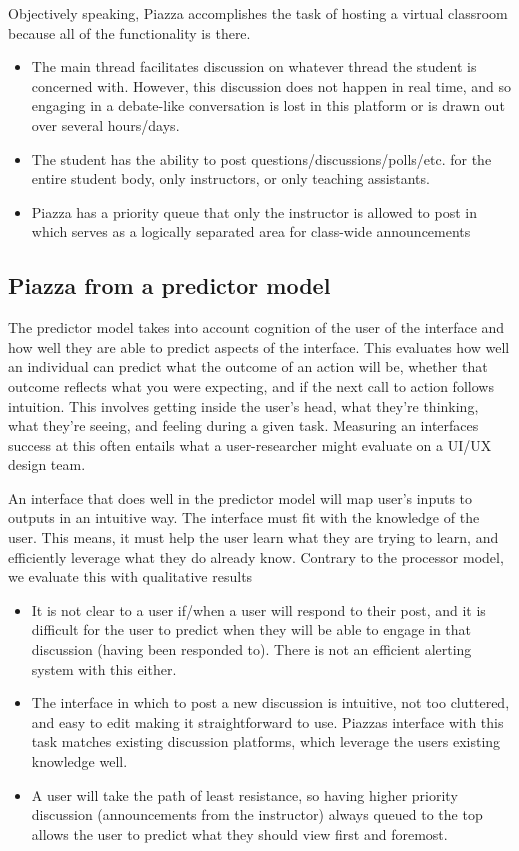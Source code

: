 \clearpage

Objectively speaking, Piazza accomplishes the task of hosting a virtual classroom because all of the functionality is there.

\begin{itemize}
\item
  The main thread facilitates discussion on whatever thread the student is concerned with. However, this discussion does not happen in real time, and so engaging in a debate-like conversation is lost in this platform or is drawn out over several hours/days.
\item
  The student has the ability to post questions/discussions/polls/etc. for the entire student body, only instructors, or only teaching assistants.
\item
  Piazza has a priority queue that only the instructor is allowed to post in which serves as a logically separated area for class-wide announcements
\end{itemize}

\subsection{Piazza from a predictor model}

The predictor model takes into account cognition of the user of the interface and how well they are able to predict aspects of the interface. This evaluates how well an individual can predict what the outcome of an action will be, whether that outcome reflects what you were expecting, and if the next call to action follows intuition. This involves getting inside the user's head, what they're thinking, what they're seeing, and feeling during a given task. Measuring an interfaces success at this often entails what a user-researcher might evaluate on a UI/UX design team.

An interface that does well in the predictor model will map user's inputs to outputs in an intuitive way. The interface must fit with the knowledge of the user. This means, it must help the user learn what they are trying to learn, and efficiently leverage what they do already know. Contrary to the processor model, we evaluate this with qualitative results

\begin{itemize}
\item
  It is not clear to a user if/when a user will respond to their post, and it is difficult for the user to predict when they will be able to engage in that discussion (having been responded to). There is not an efficient alerting system with this either.
\item
  The interface in which to post a new discussion is intuitive, not too cluttered, and easy to edit making it straightforward to use. Piazzas interface with this task matches existing discussion platforms, which leverage the users existing knowledge well.
\item
  A user will take the path of least resistance, so having higher priority discussion (announcements from the instructor) always queued to the top allows the user to predict what they should view first and foremost.
\end{itemize}

